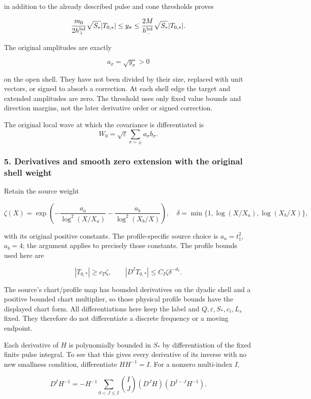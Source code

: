 \documentclass[10pt,a4paper]{article}
\begin{document}
in addition to the already described pulse and cone thresholds proves

\[
\frac{m_0}{2h_+^{\rm bd}}\sqrt{S_*}|T_{0,*}|
\le y_\sigma
\le\frac{2M}{h_-^{\rm bd}}\sqrt{S_*}|T_{0,*}|.
\]

The original amplitudes are exactly

\[
a_\sigma=\sqrt{y_\sigma}>0
\]

on the open shell. They have not been divided by their size, replaced with unit vectors, or signed to absorb a correction. At each shell edge the target and extended amplitudes are zero. The threshold uses only fixed value bounds and direction margins, not the later derivative order or signed correction.

The original local wave at which the covariance is differentiated is
\[
W_0=\sqrt\varepsilon\sum_{\sigma=\pm}a_\sigma b_\sigma.
\]

\subsubsection{5. Derivatives and smooth zero extension with the original shell weight}

Retain the source weight

\[
\zeta(X)=\exp\left(-\frac{a_a}{\log^2(X/X_a)}-
\frac{a_b}{\log^2(X_b/X)}\right),
\quad \delta=\min\{1,\log(X/X_a),\log(X_b/X)\},
\]

with its original positive constants. The profile-specific source choice is \(a_a=t_1^2\), \(a_b=4\); the argument applies to precisely those constants. The profile bounds used here are

\[
|T_{0,*}|\ge c_T\zeta,
\qquad |D^IT_{0,*}|\le C_I\zeta\delta^{-d_I}.
\]

The source's chart/profile map has bounded derivatives on the dyadic shell and a positive bounded chart multiplier, so those physical profile bounds have the displayed chart form. All differentiations here keep the label and \(Q,\varepsilon,S_*,c_i,L_s\) fixed. They therefore do not differentiate a discrete frequency or a moving endpoint.

Each derivative of \(H\) is polynomially bounded in \(S_*\) by differentiation of the fixed finite pulse integral. To see that this gives every derivative of its inverse with no new smallness condition, differentiate \(HH^{-1}=I\). For a nonzero multi-index \(I\),

\[
D^IH^{-1}=-H^{-1}\sum_{0<J\le I}\binom IJ(D^JH)(D^{I-J}H^{-1}).
\]
\end{document}
